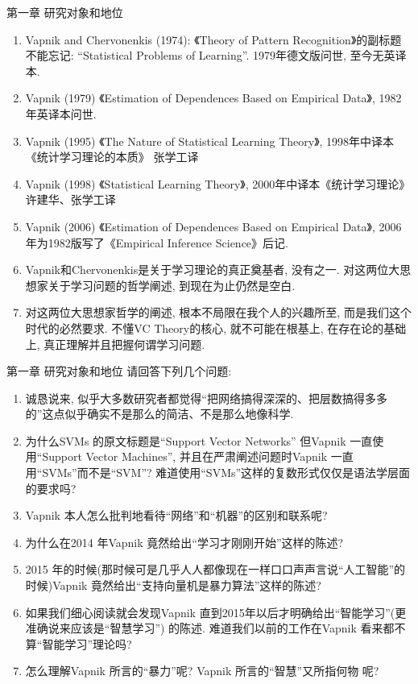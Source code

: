 \documentclass[compress,10pt,dvipsnames,notheorems]{beamer} %
\begin{document}
\begin{frame}{第一章 研究对象和地位}
\begin{solu}
\begin{enumerate}
\item Vapnik and Chervonenkis (1974): 《Theory of Pattern Recognition》的副标题不能忘记: “Statistical Problems of Learning”. 1979年德文版问世, 至今无英译本.
\item Vapnik (1979) 《Estimation of Dependences Based on Empirical Data》, 1982年英译本问世.
\item Vapnik (1995) 《The Nature of Statistical Learning Theory》, 1998年中译本 《统计学习理论的本质》 张学工译
\item Vapnik (1998) 《Statistical Learning Theory》, 2000年中译本《统计学习理论》 许建华、张学工译
\item Vapnik (2006)  《Estimation of Dependences Based on Empirical Data》, 2006年为1982版写了《Empirical Inference Science》后记.
\item Vapnik和Chervonenkis是关于学习理论的真正奠基者, 没有之一. 对这两位大思想家关于学习问题的哲学阐述, 到现在为止仍然是空白.
\item 对这两位大思想家哲学的阐述, 根本不局限在我个人的兴趣所至, 而是我们这个时代的必然要求. 不懂VC Theory的核心, 就不可能在根基上, 在存在论的基础上, 真正理解并且把握何谓学习问题.
\end{enumerate}
\end{solu}
\end{frame}

\begin{frame}{第一章 研究对象和地位}
请回答下列几个问题:

\begin{solu}
\begin{enumerate}
\item 诚恳说来, 似乎大多数研究者都觉得“把网络搞得深深的、把层数搞得多多的”这点似乎确实不是那么的简洁、不是那么地像科学.
\item 为什么SVMs 的原文标题是“Support Vector Networks” 但Vapnik 一直使用“Support Vector Machines”, 并且在严肃阐述问题时Vapnik 一直用“SVMs”而不是“SVM”? 难道使用“SVMs”这样的复数形式仅仅是语法学层面的要求吗?
\item Vapnik 本人怎么批判地看待“网络”和“机器”的区别和联系呢?
\item 为什么在2014 年Vapnik 竟然给出“学习才刚刚开始”这样的陈述?
\item 2015 年的时候(那时候可是几乎人人都像现在一样口口声声言说“人工智能”的时候)Vapnik 竟然给出“支持向量机是暴力算法”这样的陈述?
\item 如果我们细心阅读就会发现Vapnik 直到2015年以后才明确给出“智能学习”(更准确说来应该是“智慧学习”) 的陈述. 难道我们以前的工作在Vapnik 看来都不算“智能学习”理论吗?
\item 怎么理解Vapnik 所言的“暴力”呢? Vapnik 所言的“智慧”又所指何物
呢?
\end{enumerate}
\end{solu}
\end{frame}
\end{document}
